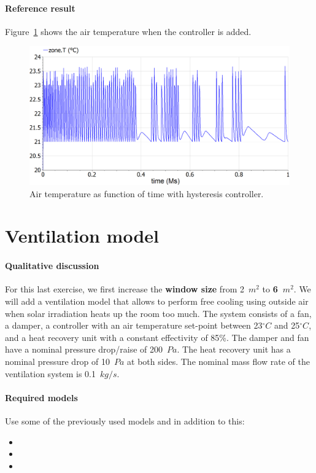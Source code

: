 \documentclass[10pt,a4paper]{article}
\begin{document}
\paragraph{Reference result}
Figure~\ref{fig:res5} shows the air temperature when the controller is added.
\begin{figure}[h]
\centering
\includegraphics[width=0.6\columnwidth]{img/result5.png}
\caption{Air temperature as function of time with hysteresis controller.}
\label{fig:res5}
\end{figure}


\section{Ventilation model} \label{sec:ventilation}
\paragraph{Qualitative discussion}
For this last exercise, we first increase the \textbf{window size} from 2~$m^2$ to \textbf{6~$m^2$}. We will add a ventilation model that allows to perform free cooling using outside air when solar irradiation heats up the room too much. The system consists of a fan, a damper, a controller with an air temperature set-point between 23$^{\circ}C$ and 25$^{\circ}C$, and a heat recovery unit with a constant effectivity of 85\%. The damper and fan have a nominal pressure drop/raise of 200~$Pa$. The heat recovery unit has a nominal pressure drop of 10~$Pa$ at both sides. The nominal mass flow rate of the ventilation system is 0.1~$kg/s$.


\paragraph{Required models}
Use some of the previously used models and in addition to this:
\begin{itemize}
\item {}
\item {}
\item {}
\end{itemize}
\end{document}
